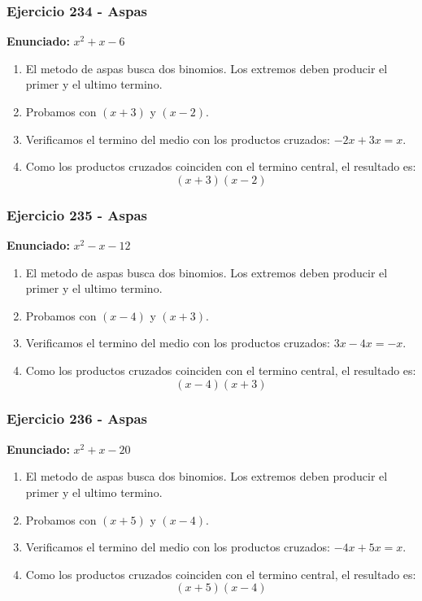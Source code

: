 \documentclass[11pt,a4paper]{article}
\begin{document}
\vspace{0.2cm}
\subsubsection*{Ejercicio 234 - Aspas}
\textbf{Enunciado:} $ x^{2} + x - 6 $\par
\begin{enumerate}[leftmargin=2em]
\item El metodo de aspas busca dos binomios. Los extremos deben producir el primer y el ultimo termino.
\item Probamos con \((x + 3)\) y \((x - 2)\).
\item Verificamos el termino del medio con los productos cruzados: \(- 2 x+3 x=x\).
\item Como los productos cruzados coinciden con el termino central, el resultado es: \[\boxed{\left(x + 3\right)\left(x - 2\right)}\]
\end{enumerate}

\vspace{0.2cm}
\subsubsection*{Ejercicio 235 - Aspas}
\textbf{Enunciado:} $ x^{2} - x - 12 $\par
\begin{enumerate}[leftmargin=2em]
\item El metodo de aspas busca dos binomios. Los extremos deben producir el primer y el ultimo termino.
\item Probamos con \((x - 4)\) y \((x + 3)\).
\item Verificamos el termino del medio con los productos cruzados: \(3 x- 4 x=- x\).
\item Como los productos cruzados coinciden con el termino central, el resultado es: \[\boxed{\left(x - 4\right)\left(x + 3\right)}\]
\end{enumerate}

\vspace{0.2cm}
\subsubsection*{Ejercicio 236 - Aspas}
\textbf{Enunciado:} $ x^{2} + x - 20 $\par
\begin{enumerate}[leftmargin=2em]
\item El metodo de aspas busca dos binomios. Los extremos deben producir el primer y el ultimo termino.
\item Probamos con \((x + 5)\) y \((x - 4)\).
\item Verificamos el termino del medio con los productos cruzados: \(- 4 x+5 x=x\).
\item Como los productos cruzados coinciden con el termino central, el resultado es: \[\boxed{\left(x + 5\right)\left(x - 4\right)}\]
\end{enumerate}
\end{document}
